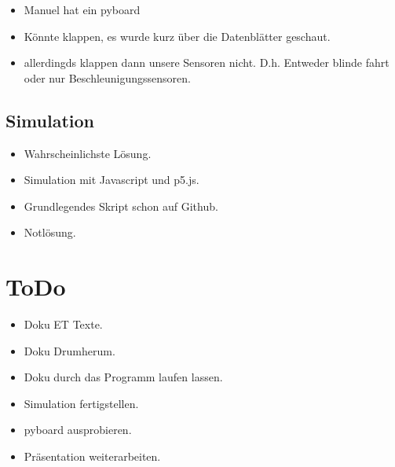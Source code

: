 \documentclass{article}
\begin{document}
\begin{itemize}

\item Manuel hat ein pyboard

\item K\"{o}nnte klappen, es wurde kurz \"{u}ber die Datenbl\"{a}tter geschaut.

\item allerdingds klappen dann unsere Sensoren nicht. D.h. Entweder blinde fahrt oder nur Beschleunigungssensoren.

\end{itemize}

\subsection{Simulation}

\begin{itemize}

\item Wahrscheinlichste L\"{o}sung.

\item Simulation mit Javascript und p5.js.

\item Grundlegendes Skript schon auf Github.

\item Notl\"{o}sung.

\end{itemize}

\section{ToDo}

\begin{itemize}

\item Doku ET Texte.

\item Doku Drumherum.

\item Doku durch das Programm laufen lassen.

\item Simulation fertigstellen.

\item pyboard ausprobieren.

\item Pr\"{a}sentation weiterarbeiten.

\end{itemize}
\end{document}
